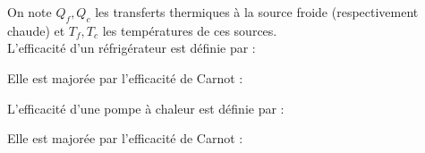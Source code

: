 \documentclass[a4paper]{article}
\begin{document}
\pagestyle{fancy}
\fancyhf{}
\setlength{\headheight}{15pt}

\begin{center}
	\large{}
\end{center}


On note \(Q_f,Q_c\) les transferts thermiques à la source froide (respectivement chaude) et \(T_f,T_c\) les températures de ces sources.\\
L'efficacité d'un réfrigérateur est définie par :
\begin{center}\end{center}
Elle est majorée par l'efficacité de Carnot :
\begin{center}\end{center}
L'efficacité d'une pompe à chaleur est définie par :
\begin{center}\end{center}
Elle est majorée par l'efficacité de Carnot :
\begin{center}\end{center}
\end{document}
